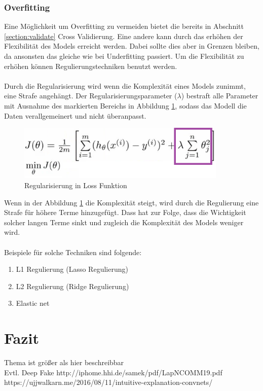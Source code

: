 \documentclass[12pt,oneside,a4paper,parskip]{scrbook}
\begin{document}
\subsection{Overfitting}

Eine Möglichkeit um Overfitting zu vermeiden bietet die bereits in Abschnitt \ref{section:validate} Cross Validierung. Eine andere kann durch das erhöhen der Flexibilität des Models erreicht werden. Dabei sollte dies aber in Grenzen bleiben, da ansonsten das gleiche wie bei Underfitting passiert. Um die Flexibilität zu erhöhen können Regulierungstechniken benutzt werden.
\\\\
Durch die Regularisierung wird wenn die Komplexität eines Models zunimmt, eine Strafe angehängt. Der Regularisierungsparameter (${\lambda}$) bestraft alle Parameter mit Ausnahme des markierten Bereichs in Abbildung \ref{fig:regFunc}, sodass das Modell die Daten verallgemeinert und nicht überanpasst.

\begin{figure}[h]
	\begin{center}
		\includegraphics[width=10cm]{Bilder/regFunc.png}
		\caption{Regularisierung in Loss Funktion}
		\label{fig:regFunc}
	\end{center}
\end{figure}

Wenn in der Abbildung \ref{fig:regFunc} die Komplexität steigt, wird durch die Regulierung eine Strafe für höhere Terme hinzugefügt. Dass hat zur Folge, dass die Wichtigkeit solcher langen Terme sinkt und zugleich die Komplexität des Models weniger wird.
\\\\
Beispiele für solche Techniken sind folgende:

\begin{enumerate}
	\item L1 Regulierung (Lasso Regulierung)
	\item L2 Regulierung (Ridge Regulierung)
	\item Elastic net
\end{enumerate}


\chapter{Fazit}
Thema ist größer als hier beschreibbar
\\Evtl. Deep Fake
http://iphome.hhi.de/samek/pdf/LapNCOMM19.pdf
https://ujjwalkarn.me/2016/08/11/intuitive-explanation-convnets/



\backmatter


\cleardoublepage
{}
{}
\printbibliography
\end{document}
